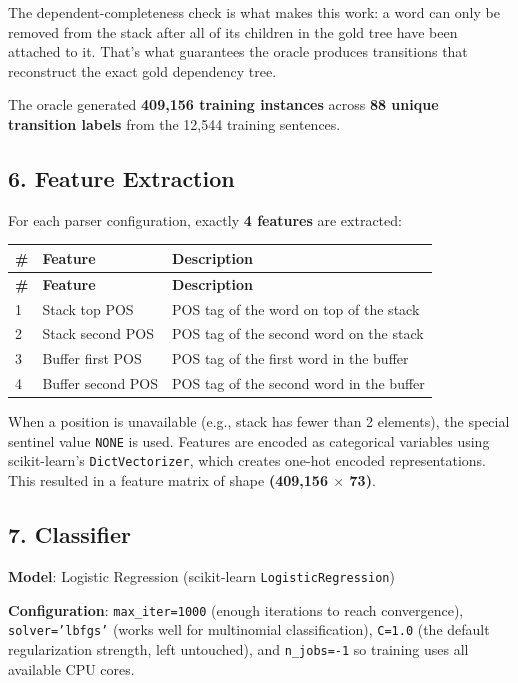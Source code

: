 \documentclass[11pt,a4paper]{article}
\begin{document}
The dependent-completeness check is what makes this work: a word can only be removed from the stack after all of its children in the gold tree have been attached to it. That's what guarantees the oracle produces transitions that reconstruct the exact gold dependency tree.

The oracle generated \textbf{409,156 training instances} across \textbf{88 unique transition labels} from the 12,544 training sentences.

\subsection*{6. Feature Extraction}

For each parser configuration, exactly \textbf{4 features} are extracted:

{\small
\setlength{\tabcolsep}{4pt}
\begin{longtable}{lll}
\toprule
\textbf{\#} & \textbf{Feature} & \textbf{Description} \\
\midrule
\endfirsthead
\toprule
\textbf{\#} & \textbf{Feature} & \textbf{Description} \\
\midrule
\endhead
1 & Stack top POS & POS tag of the word on top of the stack \\
2 & Stack second POS & POS tag of the second word on the stack \\
3 & Buffer first POS & POS tag of the first word in the buffer \\
4 & Buffer second POS & POS tag of the second word in the buffer \\
\bottomrule
\end{longtable}}

When a position is unavailable (e.g., stack has fewer than 2 elements), the special sentinel value \texttt{NONE} is used. Features are encoded as categorical variables using scikit-learn's \texttt{DictVectorizer}, which creates one-hot encoded representations. This resulted in a feature matrix of shape \textbf{(409,156 $\times$ 73)}.

\subsection*{7. Classifier}

\textbf{Model}: Logistic Regression (scikit-learn \texttt{LogisticRegression})

\textbf{Configuration}: \texttt{max\_\allowbreak{}iter=1000} (enough iterations to reach convergence), \texttt{solver='lbfgs'} (works well for multinomial classification), \texttt{C=1.\allowbreak{}0} (the default regularization strength, left untouched), and \texttt{n\_\allowbreak{}jobs=-\allowbreak{}1} so training uses all available CPU cores.
\end{document}

